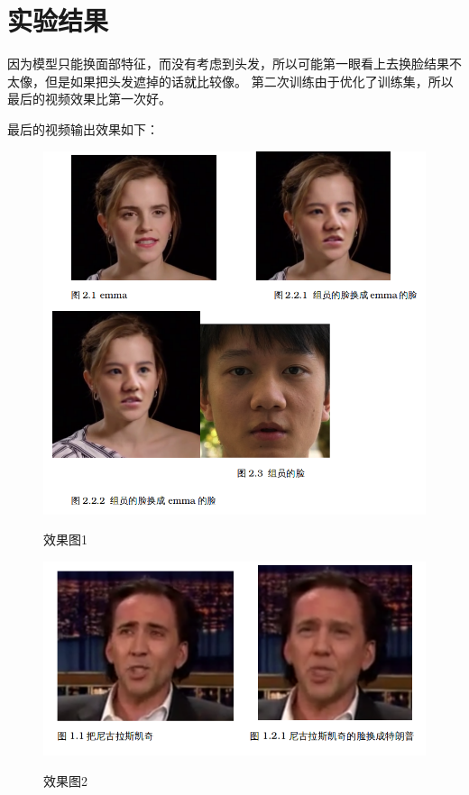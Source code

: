 \section{实验结果}
因为模型只能换面部特征，而没有考虑到头发，所以可能第一眼看上去换脸结果不太像，但是如果把头发遮掉的话就比较像。
第二次训练由于优化了训练集，所以最后的视频效果比第一次好。

最后的视频输出效果如下：

\begin{figure}[h!]
	\caption{效果图1}
	\centering
	\includegraphics[width=\textwidth]{result1.png}
	\label{fig:result1}
\end{figure}

\begin{figure}[h!]
	\caption{效果图2}
	\centering
	\includegraphics[width=\textwidth]{result2.png}
	\label{fig:result2}
\end{figure}


